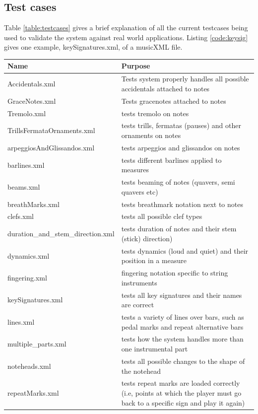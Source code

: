 \begin{appendices}
\section{Test cases}
Table \ref{table:testcases} gives a brief explanation of all the current testcases being used to validate the system against real world applications. Listing \ref{code:keysig} gives one example, keySignatures.xml, of a musicXML file.
\begin{table}[h]
\centering
\begin{tabu}to 1.0\textwidth{| X[l] | X[l] |} \hline
{Name} & {Purpose} \\ \hline	
Accidentals.xml & Tests system properly handles all possible accidentals attached to notes \\ \hline
GraceNotes.xml & Tests gracenotes attached to notes \\ \hline
Tremolo.xml & tests tremolo on notes \\ \hline
TrillsFermataOrnaments.xml & tests trills, fermatas (pauses) and other ornaments on notes \\ \hline
arpeggiosAndGlissandos.xml & tests arpeggios and glissandos on notes \\ \hline
barlines.xml & tests different barlines applied to measures \\ \hline
beams.xml & tests beaming of notes (quavers, semi quavers etc) \\ \hline
breathMarks.xml & tests breathmark notation next to notes \\ \hline
clefs.xml & tests all possible clef types \\ \hline
duration\_and\_stem\_direction.xml & tests duration of notes and their stem (stick) direction) \\ \hline
dynamics.xml & tests dynamics (loud and quiet) and their position in a measure \\ \hline
fingering.xml & fingering notation specific to string instruments \\ \hline
keySignatures.xml & tests all key signatures and their names are correct \\ \hline
lines.xml & tests a variety of lines over bars, such as pedal marks and repeat alternative bars \\ \hline
multiple\_parts.xml & tests how the system handles more than one instrumental part \\ \hline
noteheads.xml & tests all possible changes to the shape of the notehead \\ \hline
repeatMarks.xml & tests repeat marks are loaded correctly (i.e, points at which the player must go back to a specific sign and play it again) \\ \hline

\end{tabu}
\end{table}
\end{appendices}
